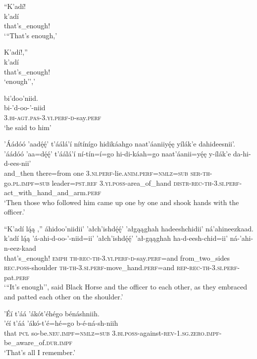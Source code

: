 \ea\label{ex:text1-67-9}
``K’adí!\\
\gll k’adí\\
     that's\_enough!\\
\glt `{``}That's enough,'
\z

\ea\label{ex:text1-67-10}
K’adí!,''\\
\gll k’adí\\
     that's\_enough!\\
\glt `enough'','
\z

\ea\label{ex:text1-67-11}
bi’doo’niid.\\
\gll bi-’d-oo-’-niid\\
     3.\textsc{bi}-\textsc{agt}.\textsc{pas}-3.\textsc{yi}.\textsc{perf}-\textsc{d}-say.\textsc{perf}\\
\glt `he said to him'
\z

\ea\label{ex:text1-68-1}
’Áádóó ’aadę́ę́’ t’áálá’í nítínígo hidikáahgo naat’áaniiyę́ę yílák’e dahideesnii’.\\
\gll ’áádóó	’aa=dę́ę́’	t’áálá’í	ní-tín=í=go	hi-di-káah=go	naat’áanii=yę́ę	y-ílák’e	da-hi-d-ees-nii’\\
     and\_then	there=from	one	3.\textsc{ni}.\textsc{perf}-lie.\textsc{anim}.\textsc{perf}=\textsc{nmlz}=\textsc{sub}	\textsc{ser}-\textsc{th}-go.\textsc{pl}.\textsc{impf}=\textsc{sub}	leader=\textsc{pst}.\textsc{ref}	3.\textsc{yi}.\textsc{poss}-area\_of\_hand	\textsc{distr}-\textsc{rec}-\textsc{th}-3.\textsc{si}.\textsc{perf}-act\_with\_hand\_and\_arm.\textsc{perf}\\
\glt `Then those who followed him came up one by one and shook hands with the officer.'
\z

\ea\label{ex:text1-68-2}
``K’adí lą́ą ,'' áhidoo’niidii’ ’ałch’ishdę́ę́’ ’ałgąąghah hadeeshchidii’ ná’ahineezkaad.\\
\gll k’adí	lą́ą	’á-ahi-d-oo-’-niid=ii’	’ałch’ishdę́ę́’	’ał-gąąghah	ha-d-eesh-chid=ii’	ná-’ahi-n-eez-kaad\\
     that's\_enough!	\textsc{emph}	\textsc{th}-\textsc{rec}-\textsc{th}-3.\textsc{yi}.\textsc{perf}-\textsc{d}-say.\textsc{perf}=and	from\_two\_sides	\textsc{rec}.\textsc{poss}-shoulder	\textsc{th}-\textsc{th}-3.\textsc{si}.\textsc{perf}-move\_hand.\textsc{perf}=and	\textsc{rep}-\textsc{rec}-\textsc{th}-3.\textsc{si}.\textsc{perf}-pat.\textsc{perf}\\
\glt `{``}It's enough'', said Black Horse and the officer to each other, as they embraced and patted each other on the shoulder.'
\z

\ea\label{ex:text1-69-1}
’Éí t’áá ’ákót’éhégo bénáshniih.\\
\gll ’éí	t’áá	’ákó-t’é=hé=go	b-é-ná-sh-niih\\
     that	\textsc{pcl}	so-be.\textsc{neu}.\textsc{impf}=\textsc{nmlz}=\textsc{sub}	3.\textsc{bi}.\textsc{poss}-against-\textsc{rev}-1.\textsc{sg}.\textsc{zero}.\textsc{impf}-be\_aware\_of.\textsc{dur}.\textsc{impf}\\
\glt `That's all I remember.'
\z

